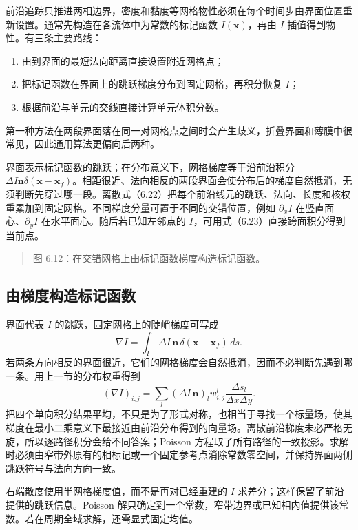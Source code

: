 \documentclass[11pt,a4paper,openany,fontset=none]{ctexbook}
\begin{document}
前沿追踪只推进两相边界，密度和黏度等网格物性必须在每个时间步由界面位置重新设置。通常先构造在各流体中为常数的标记函数 $I(\bm x)$，再由 $I$ 插值得到物性。有三条主要路线：
\begin{enumerate}[label=(\roman*)]
\item 由到界面的最短法向距离直接设置附近网格点；
\item 把标记函数在界面上的跳跃梯度分布到固定网格，再积分恢复 $I$；
\item 根据前沿与单元的交线直接计算单元体积分数。
\end{enumerate}
第一种方法在两段界面落在同一对网格点之间时会产生歧义，折叠界面和薄膜中很常见，因此通用算法更偏向后两种。

界面表示标记函数的跳跃；在分布意义下，网格梯度等于沿前沿积分 $\Delta I\bm n\delta(\bm x-\bm x_f)$。相距很近、法向相反的两段界面会使分布后的梯度自然抵消，无须判断先穿过哪一段。离散式（6.22）把每个前沿线元的跳跃、法向、长度和核权重累加到固定网格。不同梯度分量可置于不同的交错位置，例如 $\partial_xI$ 在竖直面心、$\partial_yI$ 在水平面心。随后若已知左邻点的 $I$，可用式（6.23）直接跨面积分得到当前点。

\begin{quote}\small 图 6.12：在交错网格上由标记函数梯度构造标记函数。\end{quote}
\subsection{由梯度构造标记函数}

界面代表 $I$ 的跳跃，固定网格上的陡峭梯度可写成
\begin{equation}
\nabla I=\int_\Gamma \Delta I\,\bm n\,
\delta(\bm x-\bm x_f)\,ds.
\tag{6.21}
\end{equation}
若两条方向相反的界面很近，它们的网格梯度会自然抵消，因而不必判断先遇到哪一条。用上一节的分布权重得到
\begin{equation}
(\nabla I)_{i,j}=\sum_l(\Delta I\,\bm n)_l
w_{i,j}^l\frac{\Delta s_l}{\Delta x\Delta y}.
\tag{6.22}
\end{equation}
把四个单向积分结果平均，不只是为了形式对称，也相当于寻找一个标量场，使其梯度在最小二乘意义下最接近由前沿分布得到的向量场。离散前沿梯度未必严格无旋，所以逐路径积分会给不同答案；Poisson 方程取了所有路径的一致投影。求解时必须由窄带外原有的相标记或一个固定参考点消除常数零空间，并保持界面两侧跳跃符号与法向方向一致。

右端散度使用半网格梯度值，而不是再对已经重建的 $I$ 求差分；这样保留了前沿提供的跳跃信息。Poisson 解只确定到一个常数，窄带边界或已知相内值提供该常数。若在周期全域求解，还需显式固定均值。
\end{document}
